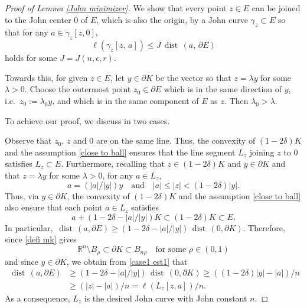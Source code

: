 \documentclass[reqno,11pt]{amsart}
\def\dist{{\mathop\mathrm{\,dist\,}}}
\numberwithin{equation}{section}
\theoremstyle{remark}
\begin{document}
\begin{proof}[Proof of Lemma \ref{John minimizer}]
We show that every point $z\in E$ can be joined to the John center  $0$  of $E$,  which is also the origin, by a John curve $\gamma_z\subset E$ so that for any $a \in \gamma_z[z,0]$,  
\begin{equation}\label{John consequence}
    \ell(\gamma_z[z,\,a])\le J\dist(a,\,\partial E)
\end{equation}
holds for some $J=J(n, \epsilon, r)$. 

Towards this, for given $z\in E$,  let $y\in\partial K$ be the vector so that  $z=\lambda y$ for some $\lambda>0$.
Choose the outermost point $z_0\in \partial E$ which is in the same direction of $y$, i.e.\ $z_0:=\lambda_0 y$, and which is in the same component of $E$ as $z$. Then $\lambda_0>\lambda$. 

To achieve our proof, we discuss in two cases.


  Observe that $z_0$, $z$ and $0$ are on the same line. Thus, the convexity of $(1-2\delta)K$ and the assumption \eqref{close to ball} ensures that the line segment $L_z$ joining $z$ to $0$ satisfies $L_z\subset E$. Furthermore, recalling that  $z\in (1-2\delta)K$ and $y\in \partial K$ and that $z=\lambda y$ for some $\lambda>0$, for any $a\in L_z$,
  \begin{equation}\label{case1 est1}
      a=(|a|/|y|)y\quad \text{and} \quad |a|\le |z|< (1-2\delta )|y|.
  \end{equation}
Thus, via $y\in \partial K$, 
  the convexity of $(1-2\delta)K$ and the assumption \eqref{close to ball} also ensure that each point $a\in L_z$ satisfies 
  $$a+(1-2\delta-|a|/|y|)K\subset (1-2\delta)K\subset E.$$
  In particular, $\dist(a, \partial E) \ge (1-2\delta-|a|/|y|)\dist(0, \partial K)$.
Therefore, since \eqref{defi mk} gives
\begin{equation}\label{lem Kbd}
 \mathbb R^n\setminus  B_{\rho}\subset \partial K\subset B_{n\rho}\quad \text{for some }\rho\in(0,1)
\end{equation}
and since $y\in \partial K$,
we obtain from \eqref{case1 est1} that
\begin{align*}
    \dist(a, \partial E)&\ge (1-2\delta-|a|/|y|)\dist(0, \partial K)\ge ((1-2\delta)|y|-|a|)/n\nonumber\\
    & \ge (|z|-|a|)/n= \ell(L_z[z,a])/n.
\end{align*}
As a consequence, $L_z$ is the desired John curve with John constant $n$. 
  

\end{proof}
\end{document}

